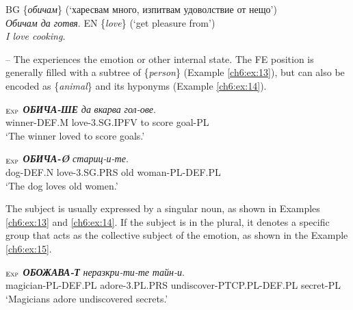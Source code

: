 \documentclass[output=paper,colorlinks,citecolor=brown]{langscibook}
\begin{document}
\begin{exe} 
\ex  \label{ch6:ex:12} 
\begin{xlist}
\ex %
BG \{\textit{обичам}\} (`харесвам много, изпитвам удоволствие от нещо’)\\ \textit{Обичам да готвя}. 
\ex %
EN \{\textit{love}\} (`get pleasure from’)\\
\textit{I love cooking}.
\end{xlist}
\end{exe}

 -- The  experiences the emotion or other internal state. The  FE position is generally filled with a subtree of \{{\textit{person}}\} (Example \ref{ch6:ex:13}), but can also be encoded as \{{\textit{animal}}\} and its hyponyms (Example \ref{ch6:ex:14}). 

\begin{exe} 
\ex  \label{ch6:ex:13} 
$_{\text{\textsc{Exp}}}$ \textit{\textbf{ОБИЧА-ШЕ}}  \textit{да} \textit{вкарва} \textit{гол-ове}.   \\ 
winner-DEF.M love-3.SG.IPFV to score goal-PL \\  %
\glt `The winner loved to score goals.' 
\end{exe}

\begin{exe}  
\ex  \label{ch6:ex:14}
$_{\text{\textsc{Exp}}}$ \textit{\textbf{ОБИЧА-Ø}}  \textit{стариц-и-те}.   \\ 
dog-DEF.N love-3.SG.PRS {old woman-PL-DEF.PL} \\ 
\glt `The dog loves old women.' 
\end{exe}

The subject  is usually expressed by a singular noun, as shown in Examples \ref{ch6:ex:13} and \ref{ch6:ex:14}. If the subject  is in the plural, it denotes a specific group that acts as the collective subject of the emotion, as shown in the Example \ref{ch6:ex:15}. 

\begin{exe} 
\ex  \label{ch6:ex:15} 
$_{\text{\textsc{Exp}}}$ \textit{\textbf{ОБОЖАВА-Т}}  \textit{неразкри-ти-те} \textit{тайн-и}.   \\ 
magician-PL-DEF.PL adore-3.PL.PRS undiscover-PTCP.PL-DEF.PL secret-PL \\ %
\glt `Magicians adore undiscovered secrets.' 
\end{exe}
\end{document}
